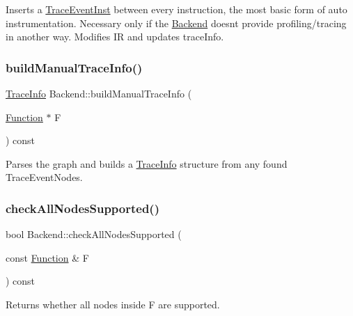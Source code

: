 Inserts a \hyperlink{classglow_1_1_trace_event_inst}{Trace\+Event\+Inst} between every instruction, the most basic form of auto instrumentation. Necessary only if the \hyperlink{classglow_1_1_backend}{Backend} doesn\textquotesingle{}t provide profiling/tracing in another way. Modifies {\ttfamily IR} and updates {\ttfamily trace\+Info}. \mbox{\label{classglow_1_1_backend_a38fcd3d6aef346d63f9b50b2a25b8e5e}} 
\subsubsection{\texorpdfstring{build\+Manual\+Trace\+Info()}{buildManualTraceInfo()}}
{\footnotesize\ttfamily \hyperlink{structglow_1_1_trace_info}{Trace\+Info} Backend\+::build\+Manual\+Trace\+Info (\begin{DoxyParamCaption}\item[{\hyperlink{classglow_1_1_function}{Function} $\ast$}]{F }\end{DoxyParamCaption}) const\hspace{0.3cm}{\ttfamily [protected]}}

Parses the graph  and builds a \hyperlink{structglow_1_1_trace_info}{Trace\+Info} structure from any found Trace\+Event\+Nodes. \mbox{\label{classglow_1_1_backend_a2ba9f3a6d8d43df0ec2f1ad44bcd462b}} 
\subsubsection{\texorpdfstring{check\+All\+Nodes\+Supported()}{checkAllNodesSupported()}}
{\footnotesize\ttfamily bool Backend\+::check\+All\+Nodes\+Supported (\begin{DoxyParamCaption}\item[{const \hyperlink{classglow_1_1_function}{Function} \&}]{F }\end{DoxyParamCaption}) const}

\begin{DoxyReturn}{Returns}
whether all nodes inside {\ttfamily F} are supported. 
\end{DoxyReturn}
\mbox{\label{classglow_1_1_backend_ab5f153ac5a6b2d1824f7a9c80ffc72f1}} 
